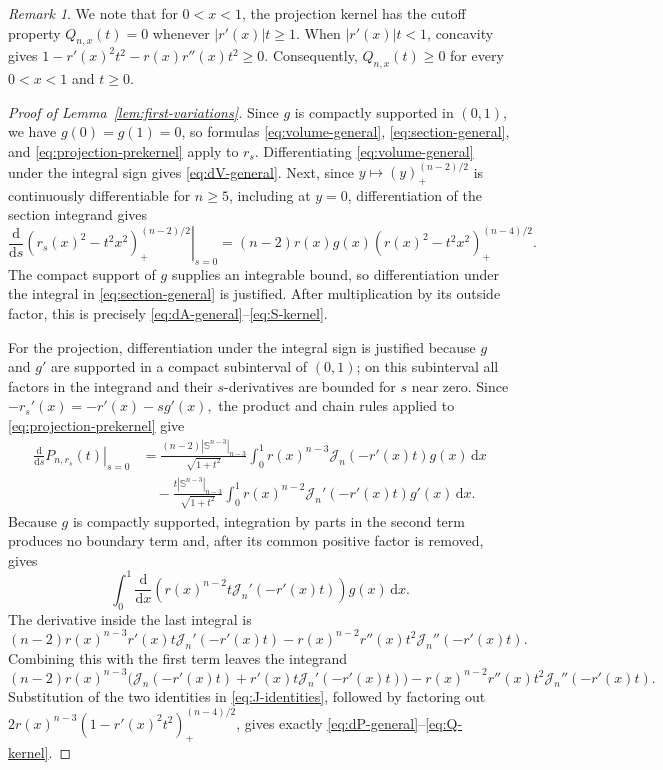 \documentclass[11pt]{article}
\theoremstyle{remark}
\newtheorem{remark}[theorem]{Remark}
\newcommand{\Sph}{\mathbb{S}}
\newcommand{\dd}{\,\mathrm{d}}
\newcommand{\pos}[1]{(#1)_{+}}
\begin{document}
\begin{remark}
    We note that for $0<x<1$, the projection kernel has the cutoff property $
 Q_{n,x}(t)=0$
 whenever  $|r'(x)|t\geq1$.
When $|r'(x)|t<1$, concavity gives
$
 1-r'(x)^2t^2-r(x)r''(x)t^2\geq0.
$
Consequently, $Q_{n,x}(t)\geq0$ for every $0<x<1$ and $t\geq0$.
\end{remark}
\begin{proof}[Proof of Lemma~\ref{lem:first-variations}] Since $g$ is compactly supported in $(0,1)$, we have $g(0)=g(1)=0$, so
formulas \eqref{eq:volume-general}, \eqref{eq:section-general}, and
\eqref{eq:projection-prekernel} apply to $r_s$.  Differentiating
\eqref{eq:volume-general} under the integral sign gives
\eqref{eq:dV-general}.  
Next, since $y\mapsto\pos{y}^{(n-2)/2}$ is continuously
differentiable for $n\geq5$, including at $y=0$, differentiation of
the section integrand gives
\[
 \left.\frac{\mathrm d}{\mathrm ds}
 \pos{r_s(x)^2-t^2x^2}^{(n-2)/2}\right|_{s=0}
 =(n-2)r(x)g(x)
   \pos{r(x)^2-t^2x^2}^{(n-4)/2}.
\]
The compact support of $g$ supplies an integrable bound, so differentiation
under the integral in \eqref{eq:section-general} is justified.  After
multiplication by its outside factor, this is precisely
\eqref{eq:dA-general}--\eqref{eq:S-kernel}.

For the projection, differentiation under the integral sign is
justified because $g$ and $g'$ are supported in a compact subinterval
of $(0,1)$; on this subinterval all factors in the integrand and their
$s$-derivatives are bounded for $s$ near zero.  Since $
-r_s'(x)=-r'(x)-sg'(x),$ 
the product and chain rules applied to
\eqref{eq:projection-prekernel} give
\begin{align*}
 \left.\frac{\mathrm d}{\mathrm d s}P_{n,r_s}(t)\right|_{s=0}
 &=\frac{(n-2)|\Sph^{n-3}|_{n-3}}{\sqrt{1+t^2}}
 \int_0^1 r(x)^{n-3}\mathcal J_n(-r'(x)t)g(x)\dd x\\
 &\quad-\frac{t|\Sph^{n-3}|_{n-3}}{\sqrt{1+t^2}}
 \int_0^1 r(x)^{n-2}\mathcal J_n'(-r'(x)t)g'(x)\dd x.
\end{align*}
Because $g$ is compactly supported, integration by parts in the second
term produces no boundary term and, after its common positive factor is
removed, gives
\[
 \int_0^1
 \frac{\mathrm d}{\mathrm dx}
 \left( r(x)^{n-2} t\mathcal J_n'(-r'(x)t)\right)g(x)\dd x.
\]
The derivative inside the last integral is
\[
 (n-2) r(x)^{n-3}r'(x)t\mathcal J_n'(-r'(x)t)
 -r(x)^{n-2}r''(x)t^2\mathcal J_n''(-r'(x)t).
\]
Combining this with the first term leaves the integrand
\[
 (n-2)r(x)^{n-3}
   \bigl(\mathcal J_n(-r'(x)t)+r'(x)t\mathcal J_n'(-r'(x)t)\bigr)
 -r(x)^{n-2}r''(x)t^2\mathcal J_n''(-r'(x)t).
\]
Substitution of the two identities in \eqref{eq:J-identities}, followed by
factoring out
$2r(x)^{n-3}\pos{1-r'(x)^2t^2}^{(n-4)/2}$, gives exactly
\eqref{eq:dP-general}--\eqref{eq:Q-kernel}.
\end{proof}
\end{document}
